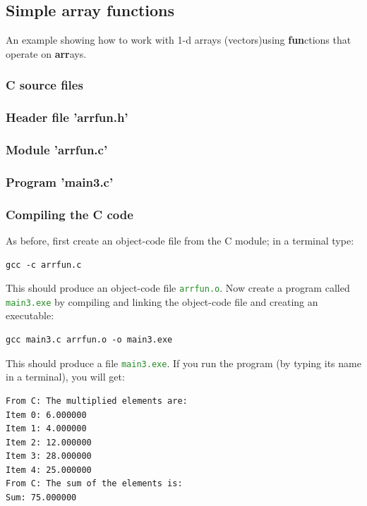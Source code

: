 \documentclass[10pt,a4paper]{article}
\newcommand{\mytext}[1]{\textcolor{ForestGreen}{\texttt{#1}}}
\begin{document}
\subsection{Simple array functions}\label{arrfun}
An example showing how to work with 1-d arrays (vectors)using
\textbf{fun}ctions that operate on \textbf{arr}ays.
\subsubsection{C source files}
\lstset{style=myC}

\subsubsection*{Header file 'arrfun.h'}


\subsubsection*{Module 'arrfun.c'}


\subsubsection*{Program 'main3.c'}


\clearpage
\subsubsection*{Compiling the C code}
As before, first create an object-code file from the C module; in a terminal  type:

\lstset{style=myBash}
\begin{lstlisting}
gcc -c arrfun.c
\end{lstlisting}

This should produce an object-code file \mytext{arrfun.o}. Now create a
program called \mytext{main3.exe} by compiling and linking the
object-code file and creating an executable:

\lstset{style=myBash}
\begin{lstlisting}
gcc main3.c arrfun.o -o main3.exe
\end{lstlisting}

This should produce a file \mytext{main3.exe}. If you run the program (by typing its name in a terminal), you will get:

\lstset{style=myBash}
\begin{lstlisting}
From C: The multiplied elements are:
Item 0: 6.000000
Item 1: 4.000000
Item 2: 12.000000
Item 3: 28.000000
Item 4: 25.000000
From C: The sum of the elements is:
Sum: 75.000000
\end{lstlisting}
\clearpage
\end{document}

